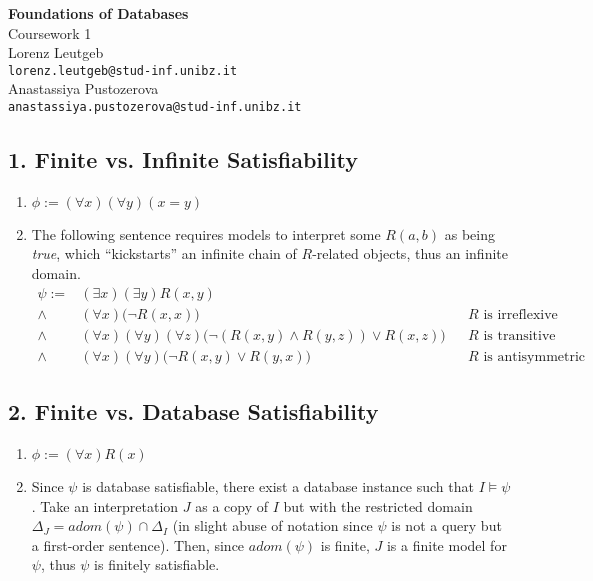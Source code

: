 \documentclass[a4paper,12pt]{article}
\begin{document}
\begin{center}
{\LARGE\bfseries Foundations of Databases}\\[3mm]

{\Large Coursework 1}\\[5mm]

Lorenz Leutgeb\\\texttt{lorenz.leutgeb@stud-inf.unibz.it}\\[2mm]
Anastassiya Pustozerova\\\texttt{anastassiya.pustozerova@stud-inf.unibz.it}
\end{center}

\subsection*{1. Finite vs. Infinite Satisfiability}

\begin{enumerate}
	\item $\phi:= (\forall x) (\forall y) (x = y)$
	\item{The following sentence requires models to interpret some $R(a, b)$ as being \emph{true}, which \enquote{kickstarts} an infinite chain of $R$-related objects, thus an infinite domain.
	\begin{align*}
		\psi := & (\exists x) (\exists y) R(x,y) \\
		\land & (\forall x)\big(\lnot R(x,x)\big) && R \text{ is irreflexive} \\
		\land & (\forall x)(\forall y)(\forall z) \big(\lnot(R(x,y) \land R(y,z)) \lor R(x,z)\big) && R \text{ is transitive}\\
		\land & (\forall x)(\forall y) \big(\lnot R(x,y) \lor R(y,x)\big) && R \text{ is antisymmetric}
	\end{align*}}
\end{enumerate}


\subsection*{2. Finite vs. Database Satisfiability}

\begin{enumerate}
	\item $\phi:= (\forall x) R(x)$
	\item Since $\psi$ is database satisfiable, there exist a database instance such that $ I \models \psi $. Take an interpretation $J$ as a copy of $I$ but with the restricted domain $\Delta_J = \mathit{adom}(\psi) \cap \Delta_I$ (in slight abuse of notation since $\psi$ is not a query but a first-order sentence). Then, since $\mathit{adom}(\psi)$ is finite,  $J$ is a finite model for $\psi$, thus $\psi$ is finitely satisfiable.
\end{enumerate}
\end{document}
